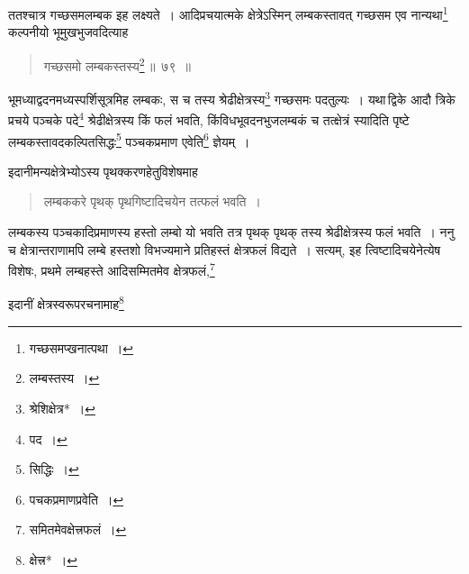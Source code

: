 \documentclass[10pt, openany]{book}
\begin{document}
{{ततश्चात्र गच्छसमलम्बक इह लक्ष्यते~। आदिप्रचयात्मके क्षेत्रेऽस्मिन्
लम्बकस्तावत्}
{गच्छसम एव नान्यथा\renewcommand{\thefootnote}{\s ९}\footnote{\s गच्छसमप्खनात्पथा~।} कल्पनीयो भूमुखभुजवदित्याह\textemdash} 

 \label{79}
\begin{quote}

\hspace{20mm} {\bs गच्छसमो लम्बकस्तस्य\renewcommand{\thefootnote}{\s १०}\footnote{\s लम्बस्तस्य~।}\,॥~७९~॥}\end{quote}

{भूमध्याद्वदनमध्यस्पर्शिसूत्रमिह लम्बकः, स च तस्य
श्रेढीक्षेत्रस्य\renewcommand{\thefootnote}{\s ११}\footnote{\s श्रेशिक्षेत्र*~।} गच्छसमः पदतुल्यः~।}
{यथा\textendash \,द्विके आदौ त्रिके प्रचये पञ्चके पदे\renewcommand{\thefootnote}{\s १२}\footnote{\s पद~।} श्रेढीक्षेत्रस्य किं
फलं भवति, किंविधभूवदनभुजलम्बकं}
{च तत्क्षेत्रं स्यादिति पृष्टे लम्बकस्तावदकल्पितसिद्धः\renewcommand{\thefootnote}{\s १३}\footnote{\s *सिद्धिः~।} पञ्चकप्रमाण
एवेति\renewcommand{\thefootnote}{\s १४}\footnote{\s पचकप्रमाणप्रवेति~।} ज्ञेयम्~।}
\vspace{0.3cm}

{इदानीमन्यक्षेत्रेभ्योऽस्य पृथक्करणहेतुविशेषमाह\textemdash}

\begin{quote}

{\bs लम्बककरे पृथक् पृथगिष्टादिचयेन तत्फलं भवति~।}\end{quote}

{लम्बकस्य पञ्चकादिप्रमाणस्य हस्तो लम्बो यो भवति तत्र पृथक् पृथक् तस्य}
{श्रेढीक्षेत्रस्य फलं भवति~। ननु च क्षेत्रान्तराणामपि लम्बे हस्तशो
विभज्यमाने प्रतिहस्तं क्षेत्रफलं}
{विद्यते~। सत्यम्, इह त्विष्टादिचयेनेत्येष विशेषः, प्रथमे लम्बहस्ते
आदिसम्मितमेव क्षेत्रफलं,\renewcommand{\thefootnote}{\s १५}\footnote{\s *समितमेवक्षेत्त्रफलं~।}}


\newpage

\vspace{3mm}

{इदानीं क्षेत्रस्वरूपरचनामाह\renewcommand{\thefootnote}{\s ३}\footnote{\s क्षेत्त्र*~।}\textemdash}

}
\end{document}
